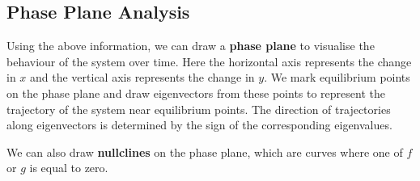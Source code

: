 \documentclass{article}
\begin{document}
\subsection{Phase Plane Analysis}
Using the above information, we can draw a \textbf{phase plane} to
visualise the behaviour of the system over time. Here the horizontal
axis represents the change in \(x\) and the vertical axis represents
the change in \(y\). We mark equilibrium points on the phase plane and
draw eigenvectors from these points to represent the trajectory of the
system near equilibrium points. The direction of trajectories along
eigenvectors is determined by the sign of the corresponding eigenvalues.

We can also draw \textbf{nullclines} on the phase plane, which are
curves where one of \(f\) or \(g\) is equal to zero.
\end{document}
